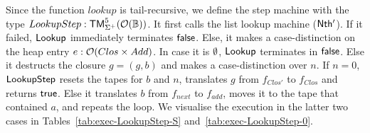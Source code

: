 Since the function $lookup$ is tail-recursive, we define the step machine with the type $LookupStep : \mathsf{TM}_{\Sigma^+}^5(\mathcal{O}(\mathbb{B}))$.  It first
calls the list lookup machine ($\mathsf{Nth'}$).  If it failed, $\mathsf{Lookup}$ immediately terminates $\mathsf{false}$.  Else, it makes a case-distinction on the
heap entry $e : \mathcal{O}(Clos \times Add)$.  In case it is $\emptyset$, $\mathsf{Lookup}$ terminates in $\mathsf{false}$.  Else it destructs the closure $g = (g,b)$
and makes a case-distinction over $n$.  If $n=0$, $\mathsf{LookupStep}$ resets the tapes for $b$ and $n$, translates $g$ from $f_{Clos'}$ to $f_{Clos}$
and returns $\mathsf{true}$.  Else it translates $b$ from $f_{next}$ to $f_{add}$, moves it to the tape that contained $a$, and repeats the loop.  We
visualise the execution in the latter two cases in Tables~\ref{tab:exec-LookupStep-S} and~\ref{tab:exec-LookupStep-0}.

